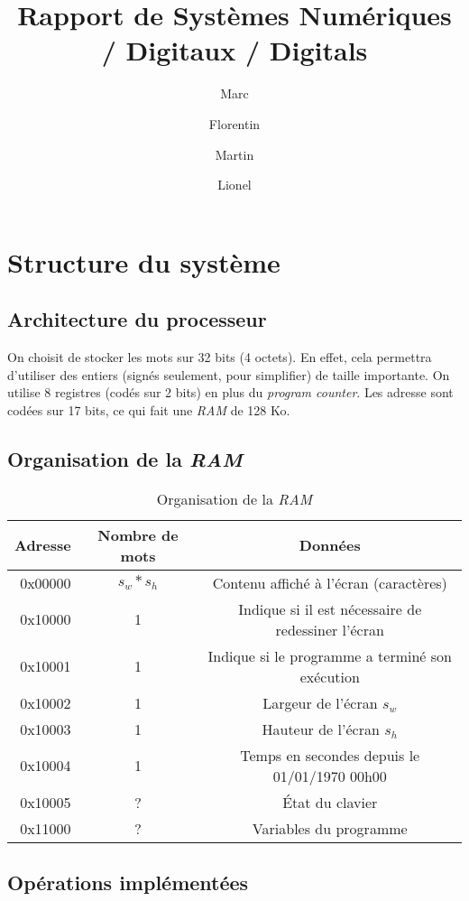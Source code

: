 \documentclass[a4paper, 10pt, french]{article}
\title{Rapport de Systèmes Numériques / Digitaux / Digitals}
\author{Marc \bsc{Ducret} \and Florentin \bsc{Guth} \and Martin \bsc{Ruffel} \and Lionel \bsc{Zoubritzky}}
\newcommand{\foreign}[1]{\emph{#1}}
\begin{document}
\maketitle


\section{Structure du système}

\subsection{Architecture du processeur}

On choisit de stocker les mots sur 32 bits (4 octets). En effet, cela permettra d'utiliser des entiers (signés seulement, pour simplifier) de taille importante. On utilise 8 registres (codés sur 2 bits) en plus du \foreign{program counter}. Les adresse sont codées sur 17 bits, ce qui fait une \foreign{RAM} de 128 Ko.

\subsection{Organisation de la \foreign{RAM}}

\begin{table}[h]
 \centering
 \begin{tabular}{|R|c|c|}
  \hline
  Adresse & Nombre de mots & Données \\
  \hline
  0x00000 & $s_w * s_h$ & Contenu affiché à l'écran (caractères) \\
  \hline
  0x10000 & 1 & Indique si il est nécessaire de redessiner l'écran \\
  0x10001 & 1 & Indique si le programme a terminé son exécution \\
  0x10002 & 1 & Largeur de l'écran $s_w$ \\
  0x10003 & 1 & Hauteur de l'écran $s_h$ \\
  0x10004 & 1 & Temps en secondes depuis le 01/01/1970 00h00 \\
  \hline
  0x10005 & ? & \'Etat du clavier \\
  \hline
  0x11000 & ? & Variables du programme \\
  \hline
 \end{tabular}
 \caption{Organisation de la \foreign{RAM}}
\end{table}


\subsection{Opérations implémentées}
\end{document}
